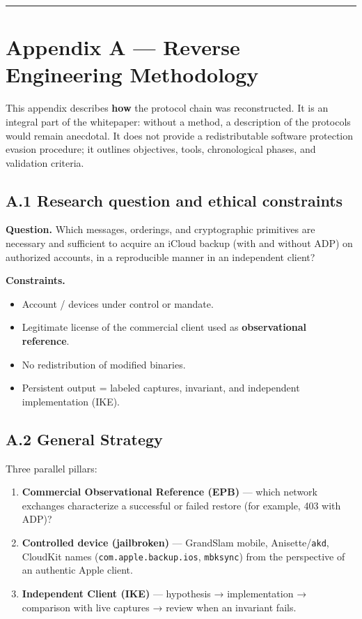 \documentclass[
  english,
  10pt]{article}
\providecommand{\tightlist}{%
  \setlength{\itemsep}{0pt}\setlength{\parskip}{0pt}}
\begin{document}
\begin{center}\rule{0.5\linewidth}{0.5pt}\end{center}

\section{Appendix A --- Reverse Engineering
Methodology}\label{appendix-a-reverse-engineering-methodology}

This appendix describes \textbf{how} the protocol chain was
reconstructed. It is an integral part of the whitepaper: without a
method, a description of the protocols would remain anecdotal. It does
not provide a redistributable software protection evasion procedure; it
outlines objectives, tools, chronological phases, and validation
criteria.

\subsection{A.1 Research question and ethical
constraints}\label{a.1-research-question-and-ethical-constraints}

\textbf{Question.} Which messages, orderings, and cryptographic
primitives are necessary and sufficient to acquire an iCloud backup
(with and without ADP) on authorized accounts, in a reproducible manner
in an independent client?

\textbf{Constraints.}

\begin{itemize}
\tightlist
\item
  Account / devices under control or mandate.
\item
  Legitimate license of the commercial client used as
  \textbf{observational reference}.
\item
  No redistribution of modified binaries.
\item
  Persistent output = labeled captures, invariant, and independent
  implementation (IKE).
\end{itemize}

\subsection{A.2 General Strategy}\label{a.2-general-strategy}

Three parallel pillars:

\begin{enumerate}
\def\labelenumi{\arabic{enumi}.}
\tightlist
\item
  \textbf{Commercial Observational Reference (EPB)} --- which network
  exchanges characterize a successful or failed restore (for example,
  403 with ADP)?
\item
  \textbf{Controlled device (jailbroken)} --- GrandSlam mobile,
  Anisette/\texttt{akd}, CloudKit names (\texttt{com.apple.backup.ios},
  \texttt{mbksync}) from the perspective of an authentic Apple client.
\item
  \textbf{Independent Client (IKE)} --- hypothesis → implementation →
  comparison with live captures → review when an invariant fails.
\end{enumerate}
\end{document}
